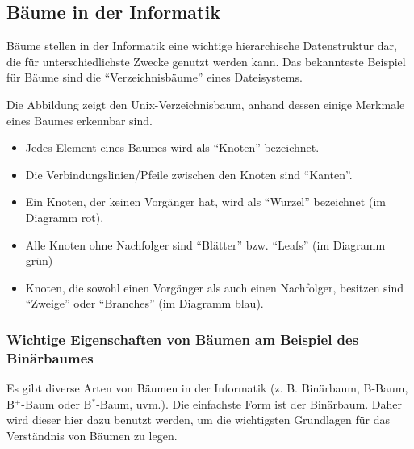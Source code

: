       \subsection{B\"aume in der Informatik}
        B\"aume stellen in der Informatik eine wichtige hierarchische Datenstruktur dar, die f\"ur unterschiedlichste Zwecke genutzt werden kann. Das bekannteste Beispiel f\"ur B\"aume sind die \enquote{Verzeichnisb\"aume} eines Dateisystems.
        \begin{center}
        \end{center}
        Die Abbildung zeigt den Unix-Verzeichnisbaum, anhand dessen einige Merkmale eines Baumes erkennbar sind.
        \begin{itemize}
          \item Jedes Element eines Baumes wird als \enquote{Knoten} bezeichnet.
          \item Die Verbindungslinien/Pfeile zwischen den Knoten sind \enquote{Kanten}.
          \item Ein Knoten, der keinen Vorg\"anger hat, wird als \enquote{Wurzel} bezeichnet (im Diagramm rot).
          \item Alle Knoten ohne Nachfolger sind \enquote{Bl\"atter} bzw. \enquote{Leafs} (im Diagramm gr\"un)
          \item Knoten, die sowohl einen Vorg\"anger als auch einen Nachfolger, besitzen sind \enquote{Zweige} oder \enquote{Branches} (im Diagramm blau).
        \end{itemize}
        \subsubsection{Wichtige Eigenschaften von B\"aumen am Beispiel des Bin\"arbaumes}
          Es gibt diverse Arten von B\"aumen in der Informatik (z. B. Bin\"arbaum, B-Baum, B$^+$-Baum oder B$^*$-Baum, uvm.). Die einfachste Form ist der Bin\"arbaum. Daher wird dieser hier dazu benutzt werden, um die wichtigsten Grundlagen f\"ur das Verst\"andnis von B\"aumen zu legen.

